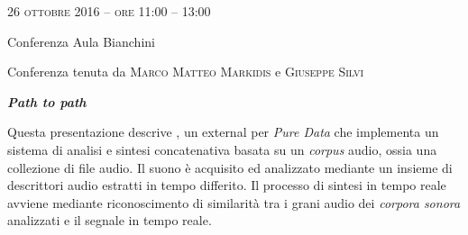 
\begin{flushright}

\large{
	\scshape{
	26 ottobre 2016 -- ore 11:00 -- 13:00
	}}

\medskip
	
\small{Conferenza
	\newline Aula Bianchini}

\medskip

{\fontsize{42}{42} }

\normalfont

\normalsize

\bigskip

Conferenza tenuta da \textsc{Marco Matteo Markidis} e \textsc{Giuseppe Silvi}

\bigskip

\textbf{\emph{Path to path~}}

Questa presentazione descrive \pa, %
un external per \emph{Pure Data} che implementa un sistema di analisi e sintesi concatenativa basata su un \emph{corpus} audio, ossia una collezione di file audio. %
Il suono \`e acquisito %
ed analizzato mediante un insieme di descrittori audio estratti in tempo differito. Il processo di sintesi in tempo reale avviene mediante riconoscimento di similarit\`a tra i grani audio dei \emph{corpora sonora} analizzati e il segnale in tempo reale.


\end{flushright}
